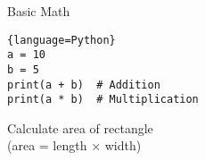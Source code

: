 \begin{frame}[fragile]{Basic Math}
	\begin{lstlisting}{language=Python}
a = 10
b = 5
print(a + b)  # Addition
print(a * b)  # Multiplication
    \end{lstlisting}

	\pause
	Calculate area of rectangle \\
	(area = length × width)
\end{frame}